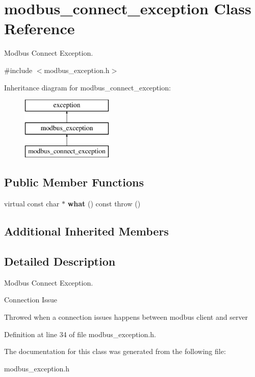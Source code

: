 \hypertarget{classmodbus__connect__exception}{}\section{modbus\+\_\+connect\+\_\+exception Class Reference}
\label{classmodbus__connect__exception}


Modbus Connect Exception.  




{\ttfamily \#include $<$modbus\+\_\+exception.\+h$>$}

Inheritance diagram for modbus\+\_\+connect\+\_\+exception\+:\begin{figure}[H]
\begin{center}
\leavevmode
\includegraphics[height=3.000000cm]{classmodbus__connect__exception}
\end{center}
\end{figure}
\subsection*{Public Member Functions}
\begin{DoxyCompactItemize}
\item 
\mbox{\label{classmodbus__connect__exception_acde6853b845c8fb361a57e9d5732a8bd}} 
virtual const char $\ast$ {\bfseries what} () const  throw ()
\end{DoxyCompactItemize}
\subsection*{Additional Inherited Members}


\subsection{Detailed Description}
Modbus Connect Exception. 

Connection Issue

Throwed when a connection issues happens between modbus client and server 

Definition at line 34 of file modbus\+\_\+exception.\+h.



The documentation for this class was generated from the following file\+:\begin{DoxyCompactItemize}
\item 
modbus\+\_\+exception.\+h\end{DoxyCompactItemize}
